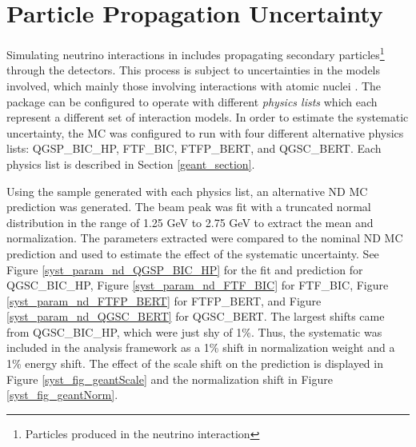 {\begin{figure}
\end{figure}
\clearpage

\section{Particle Propagation Uncertainty}

Simulating neutrino interactions in \nova includes propagating
secondary particles\footnote{
Particles produced in the neutrino interaction}
through the detectors.
This process is subject to uncertainties in the models involved, which mainly
those involving interactions with atomic nuclei \cite{folger2004binary}.
The \geant package can be configured to operate with different
\textit{physics lists} which each represent a different set of interaction
models.
In order to estimate the systematic uncertainty, the \nova MC was
configured to run with four different alternative physics lists:
QGSP\_BIC\_HP, FTF\_BIC, FTFP\_BERT, and QGSC\_BERT.
Each physics list is described in Section \ref{geant_section}.

Using the sample generated with each physics list, an
alternative ND MC prediction was generated.
The beam peak was fit with a truncated normal distribution in the range
of 1.25 GeV to 2.75 GeV to extract the mean and normalization.
The parameters extracted were compared to the nominal ND MC
prediction and used to estimate the effect of the systematic uncertainty.
See Figure \ref{syst_param_nd_QGSP_BIC_HP} for the fit and prediction for
QGSC\_BIC\_HP,
Figure \ref{syst_param_nd_FTF_BIC} for FTF\_BIC,
Figure \ref{syst_param_nd_FTFP_BERT} for FTFP\_BERT,
and Figure \ref{syst_param_nd_QGSC_BERT} for QGSC\_BERT.
The largest shifts came from QGSC\_BIC\_HP, which were just shy of 1\%.
Thus, the systematic was included in the analysis framework as a 1\%
shift in normalization weight and a 1\% energy shift.
The effect of the scale shift on the prediction is displayed
in Figure \ref{syst_fig_geantScale}
and the normalization shift in Figure \ref{syst_fig_geantNorm}.

}
